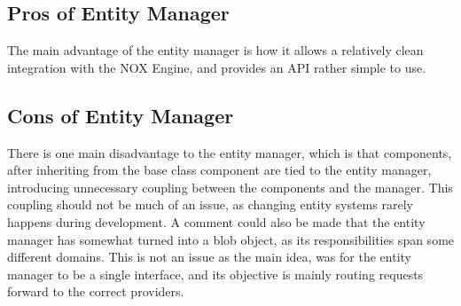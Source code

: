 \subsection{Pros of Entity Manager}
The main advantage of the entity manager is how it allows a relatively clean integration
with the NOX Engine, and provides an API rather simple to use.

\subsection{Cons of Entity Manager}
There is one main disadvantage to the entity manager, which is that components,
after inheriting from the base class component are tied to the entity manager, introducing
unnecessary coupling between the components and the manager. This coupling should not be much of an issue, as changing entity systems rarely happens during development.
A comment could also be made that the entity manager has somewhat turned into a blob object,
as its responsibilities span some different domains. This is not an issue
as the main idea, was for the entity manager to be a single interface,
and its objective is mainly routing requests forward to the correct providers.
